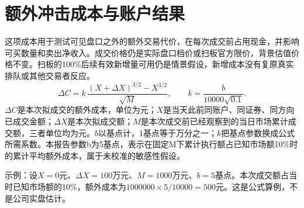 \documentclass[UTF8,10pt,a4paper,fontset=fandol]{ctexart}
\begin{document}
\section*{额外冲击成本与账户结果}这项成本用于测试可见盘口之外的额外交易代价，在每次成交前占用现金，并影响可买数量和卖出净收入。成交价格仍是实际盘口档价或扫板官方限价，背景估值价格不变。扫板的100\%后续有效新增量可用仍是情景假设，新增成本没有复原真实排队或其他交易者反应。\[\Delta C=k\,\frac{(X+\Delta X)^{3/2}-X^{3/2}}{\sqrt{M}},\qquad k=\frac{b}{10000\sqrt{0.1}}.\]$\Delta C$是本次拟成交的额外成本，单位为元；$X$是当天此前同账户、同证券、同方向已成交金额；$\Delta X$是本次拟成交额；$M$是本次成交前已经观察到的当日市场累计成交额，三者单位均为元。$b$以基点计，1基点等于万分之一；$k$把基点参数换成公式所需系数。本报告参数b为5基点，表示在固定M下累计执行额占已知市场额10\%时的累计平均额外成本，属于未校准的敏感性假设。\par 示例：设$X=0$元、$\Delta X=100$万元、$M=1000$万元、$b=5$基点。本次成交额占当时已知市场额的10\%，额外成本为$1000000\times5/10000=500$元。这是公式算例，不是公司实盘估计。
\end{document}
